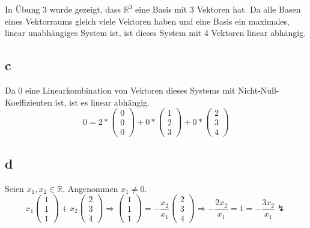 \documentclass[a4paper,10pt]{article}
\begin{document}
In Übung 3 wurde gezeigt, dass $\mathbb{R}^3$ eine Basis mit 3 Vektoren hat.
Da alle Basen eines Vektorraums gleich viele Vektoren haben und eine Basis ein maximales, linear unabhängiges System ist, ist dieses System mit 4 Vektoren linear abhängig.

\subsection*{c}

Da 0 eine Linearkombination von Vektoren dieses Systems mit Nicht-Null-Koeffizienten ist, ist es linear abhängig.
\begin{equation}
 0 = 2 * \begin{pmatrix}0\\0\\0\end{pmatrix} + 0 * \begin{pmatrix}1\\2\\3\end{pmatrix} + 0 * \begin{pmatrix}2\\3\\4\end{pmatrix}
\end{equation}

\subsection*{d}

Seien $x_1, x_2 \in \mathbb{R}$.
Angenommen $x_1 \ne 0$.
\begin{equation*}
 x_1\begin{pmatrix}1\\1\\1\end{pmatrix} + x_2\begin{pmatrix}2\\3\\4\end{pmatrix} \Rightarrow \begin{pmatrix}1\\1\\1\end{pmatrix} = -\frac{x_2}{x_1}\begin{pmatrix}2\\3\\4\end{pmatrix} \Rightarrow -\frac{2x_2}{x_1} = 1 = -\frac{3x_2}{x_1} \lightning
\end{equation*}
\end{document}
